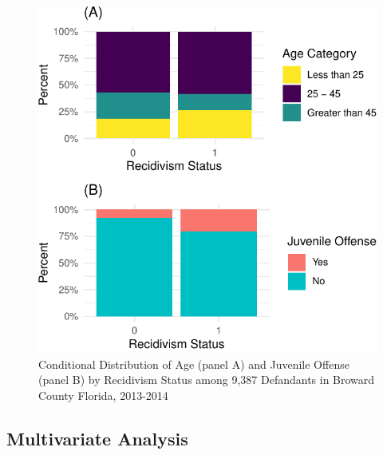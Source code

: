 \documentclass[12pt, twoside]{amherstthesis}
\begin{document}
\begin{figure}

{\centering \includegraphics{Dasha-Asienga_StatThesis_files/figure-latex/ch3fig6-1} 

}

\caption{Conditional Distribution of Age (panel A) and Juvenile Offense (panel B) by Recidivism Status among 9,387 Defandants in Broward County Florida, 2013-2014}\label{fig:ch3fig6}
\end{figure}
\hypertarget{multivariate-analysis}{%
\subsection{Multivariate Analysis}\label{multivariate-analysis}}
\end{document}
